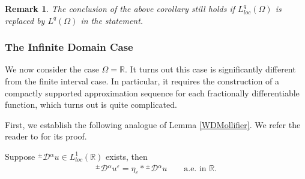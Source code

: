 \documentclass[leqno,final]{siamltex}
\numberwithin{equation}{section}
\newtheorem{remark}{Remark}[section]
\newcommand{\eps}{\varepsilon}
\renewcommand{\(}{\bigl(}
\renewcommand{\)}{\bigr)}
\newcommand{\R}{\mathbb{R}}
\begin{document}
        \begin{remark}
            The conclusion of the above corollary still holds if $L^q_{loc}(\Omega)$ is replaced by $L^q(\Omega)$
            in the statement.
        \end{remark}

        
    \subsubsection{\bf The Infinite Domain Case}\label{sec-4.3.2}
    We now consider the case $\Omega = \R$. It turns out this case is significantly different
    from the finite interval case. In particular, it requires the construction of a compactly supported 
    approximation sequence for each fractionally differentiable function, which turns out is quite complicated. 
    
    First, we establish the following analogue of Lemma \ref{WDMollifier}. We refer the reader  
    to \cite[Lemma 3.3]{Feng_Sutton} for its proof. 
    
        \begin{lemma}\label{WDMollifierR}
        Suppose ${^{\pm}}{\mathcal{D}}{^{\alpha}}u \in L^1_{loc}(\R)$ exists, then 
             \begin{align} \label{WeakMollifier2}
                {^{\pm}}{\mathcal{D}}{^{\alpha}} u^\eps = \eta_{\eps} * {^{\pm}}{\mathcal{D}}{^{\alpha}} u \qquad\mbox{a.e. in } \R. 
            \end{align}
 
        \end{lemma}
        
\end{document}
